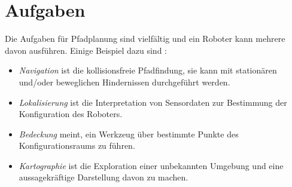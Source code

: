 \section{Aufgaben} \label{AufgabenPP}

Die Aufgaben für Pfadplanung sind vielfältig und ein Roboter kann mehrere davon ausführen. Einige Beispiel dazu sind \cite[~S. 9,10]{Principles:05}:
\begin{itemize}
	\item \textit{Navigation} ist die kollisionsfreie Pfadfindung, sie kann mit stationären und/oder beweglichen Hindernissen durchgeführt werden.
	\item \textit{Lokalisierung} ist die Interpretation von Sensordaten zur Bestimmung der Konfiguration des Roboters.
	\item \textit{Bedeckung} meint, ein Werkzeug über bestimmte Punkte des Konfigurationsraums zu führen.
	\item \textit{Kartographie} ist die Exploration einer unbekannten Umgebung und eine aussagekräftige Darstellung davon zu machen.
\end{itemize}


